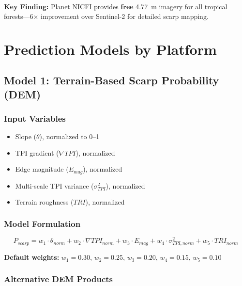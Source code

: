 \documentclass[11pt,letterpaper]{article}
\begin{document}
\textbf{Key Finding:} Planet NICFI provides \textbf{free} \SI{4.77}{m} imagery for all tropical forests---6$\times$ improvement over Sentinel-2 for detailed scarp mapping.

\section{Prediction Models by Platform}
\label{sec:models}

\subsection{Model 1: Terrain-Based Scarp Probability (DEM)}

\subsubsection{Input Variables}
\begin{itemize}[noitemsep]
    \item Slope ($\theta$), normalized to 0--1
    \item TPI gradient ($\nabla TPI$), normalized
    \item Edge magnitude ($E_{mag}$), normalized
    \item Multi-scale TPI variance ($\sigma^2_{TPI}$), normalized
    \item Terrain roughness ($TRI$), normalized
\end{itemize}

\subsubsection{Model Formulation}

\begin{equation}
\label{eq:scarp_prob}
P_{scarp} = w_1 \cdot \theta_{norm} + w_2 \cdot \nabla TPI_{norm} + w_3 \cdot E_{mag} + w_4 \cdot \sigma^2_{TPI,norm} + w_5 \cdot TRI_{norm}
\end{equation}

\textbf{Default weights:} $w_1 = 0.30$, $w_2 = 0.25$, $w_3 = 0.20$, $w_4 = 0.15$, $w_5 = 0.10$

\subsubsection{Alternative DEM Products}
\end{document}
